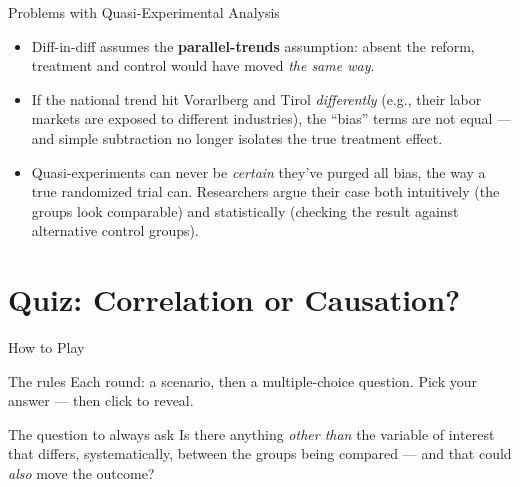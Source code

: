 \documentclass[11pt,aspectratio=169]{beamer}
\begin{document}
 

\begin{frame}{Problems with Quasi-Experimental Analysis}
  \begin{itemize}
    \item Diff-in-diff assumes the \textbf{parallel-trends} assumption: absent the reform, treatment and control would have moved \emph{the same way}.
    \item If the national trend hit Vorarlberg and Tirol \emph{differently} (e.g., their labor markets are exposed to different industries), the ``bias'' terms are not equal --- and simple subtraction no longer isolates the true treatment effect.
    \item Quasi-experiments can never be \emph{certain} they've purged all bias, the way a true randomized trial can. Researchers argue their case both intuitively (the groups look comparable) and statistically (checking the result against alternative control groups).
  \end{itemize}

\end{frame}

\section{Quiz: Correlation or Causation?}

\begin{frame}{How to Play}
  \centering
  \Large \faQuestionCircle
  \vspace{0.5em}
  \normalsize
  \begin{block}{The rules}
    Each round: a scenario, then a multiple-choice question. Pick your answer --- then click to reveal.
  \end{block}
  \begin{alertblock}{The question to always ask}
    Is there anything \emph{other than} the variable of interest that differs, systematically, between the groups being compared --- and that could \emph{also} move the outcome?
  \end{alertblock}
\end{frame}
\end{document}
